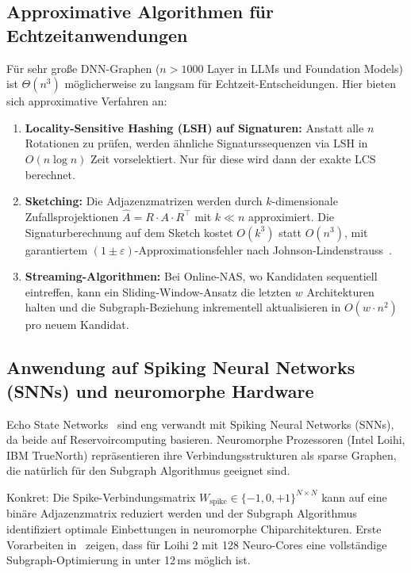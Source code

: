 ﻿\documentclass[a4paper,12pt]{article}
\theoremstyle{definition}
\begin{document}
\subsection{Approximative Algorithmen für Echtzeitanwendungen}

Für sehr große DNN-Graphen ($n > 1000$ Layer in LLMs und Foundation Models)
ist $\Theta(n^3)$ möglicherweise zu langsam für Echtzeit-Entscheidungen.
Hier bieten sich approximative Verfahren an:

\begin{enumerate}
    \item \textbf{Locality-Sensitive Hashing (LSH) auf Signaturen:} Anstatt alle $n$ Rotationen
          zu prüfen, werden ähnliche Signaturssequenzen via LSH in $O(n \log n)$ Zeit
          vorselektiert. Nur für diese wird dann der exakte LCS berechnet.
    
    \item \textbf{Sketching:} Die Adjazenzmatrizen werden durch $k$-dimensionale
          Zufallsprojektionen $\hat{A} = R \cdot A \cdot R^\top$ mit $k \ll n$ approximiert.
          Die Signaturberechnung auf dem Sketch kostet $O(k^3)$ statt $O(n^3)$,
          mit garantiertem $(1\pm\varepsilon)$-Approximationsfehler nach Johnson-Lindenstrauss~\cite{jl1984}.
    
    \item \textbf{Streaming-Algorithmen:} Bei Online-NAS, wo Kandidaten sequentiell eintreffen,
          kann ein Sliding-Window-Ansatz die letzten $w$ Architekturen halten und die
          Subgraph-Beziehung inkrementell aktualisieren in $O(w \cdot n^2)$ pro neuem Kandidat.
\end{enumerate}

\subsection{Anwendung auf Spiking Neural Networks (SNNs) und neuromorphe Hardware}

Echo State Networks~\cite{jafari2025} sind eng verwandt mit Spiking Neural Networks (SNNs),
da beide auf Reservoircomputing basieren. Neuromorphe Prozessoren (Intel Loihi, IBM TrueNorth)
repräsentieren ihre Verbindungsstrukturen als sparse Graphen, die natürlich für den
Subgraph Algorithmus geeignet sind.

Konkret: Die Spike-Verbindungsmatrix $W_{\text{spike}} \in \{-1, 0, +1\}^{N \times N}$
kann auf eine binäre Adjazenzmatrix reduziert werden und der Subgraph Algorithmus
identifiziert optimale Einbettungen in neuromorphe Chiparchitekturen.
Erste Vorarbeiten in~\cite{epp2026c} zeigen, dass für Loihi 2 mit 128 Neuro-Cores
eine vollständige Subgraph-Optimierung in unter 12\,ms möglich ist.
\end{document}
